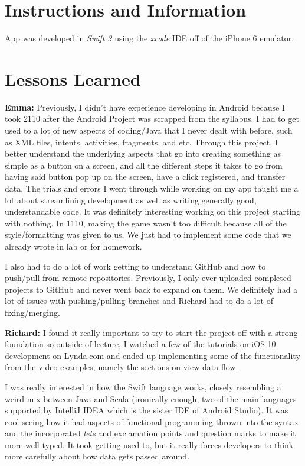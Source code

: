 \documentclass[12pt]{article}
\begin{document}
\maketitle

\section{Instructions and Information}
\noindent App was developed in \textit{Swift 3} using the \textit{xcode} IDE off of the iPhone 6 emulator.

\section{Lessons Learned}
\textbf{Emma:} Previously, I didn't have experience developing in Android because I took 2110 after the Android Project was scrapped from the syllabus. I had to get used to a lot of new aspects of coding/Java that I never dealt with before, such as XML files, intents, activities, fragments, and etc. Through this project, I better understand the underlying aspects that go into creating something as simple as a button on a screen, and all the different steps it takes to go from having said button pop up on the screen, have a click registered, and transfer data. The trials and errors I went through while working on my app taught me a lot about streamlining development as well as writing generally good, understandable code. It was definitely interesting working on this project starting with nothing. In 1110, making the game wasn't too difficult because all of the style/formatting was given to us. We just had to implement some code that we already wrote in lab or for homework.
\break

\noindent I also had to do a lot of work getting to understand GitHub and how to push/pull from remote repositories. Previously, I only ever uploaded completed projects to GitHub and never went back to expand on them. We definitely had a lot of issues with pushing/pulling branches and Richard had to do a lot of fixing/merging.
\break

\noindent \textbf{Richard:} I found it really important to try to start the project off with a strong foundation so outside of lecture, I watched a few of the tutorials on iOS 10 development on Lynda.com and ended up implementing some of the functionality from the video examples, namely the sections on view data flow.\break

\noindent I was really interested in how the Swift language works, closely resembling a weird mix between Java and Scala (ironically enough, two of the main languages supported by IntelliJ IDEA which is the sister IDE of Android Studio). It was cool seeing how it had aspects of functional programming thrown into the syntax and the incorporated \textit{lets} and exclamation points and question marks to make it more well-typed. It took getting used to, but it really forces developers to think more carefully about how data gets passed around.\break
\end{document}

